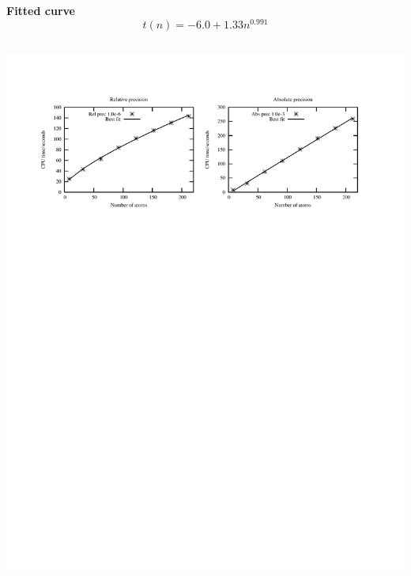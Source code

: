 \begin{frame}
\begin{columns}
\begin{column}{.60\textwidth}
        \vspace{2mm}

	\textbf{Fitted curve}
	\begin{equation}
	    \nonumber
	    t(n) = -6.0 + 1.33n^{0.991}
	\end{equation}
        \vspace{2mm}
    \end{column}
    \end{columns}    
    \begin{center}
	\includegraphics[scale=0.6, clip, viewport = 50 550 540 730]{figures/linearScaling.pdf}
    \end{center}
    \vspace{15mm}
\end{frame}


